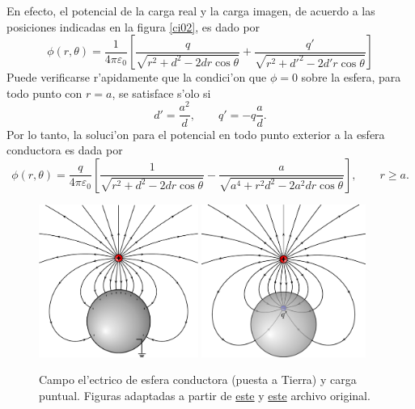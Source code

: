 En efecto, el potencial de la carga real y la carga imagen, de acuerdo a las posiciones indicadas en la figura \ref{ci02}, es dado por
\begin{equation}
 \phi(r,\theta)=\frac{1}{4\pi\varepsilon_0}\left[\frac{q}{\sqrt{
r^2+d^2-2dr\cos\theta } } +\frac{q'}{\sqrt{r^2+d'^2-2d'r\cos\theta}}\right]
\end{equation}
Puede verificarse r'apidamente que la condici'on que $\phi=0$ sobre la esfera, para todo punto con $r=a$, se satisface s'olo si
\begin{equation}
 d'=\frac{a^2}{d}, \qquad q'=-q\frac{a}{d}.
\end{equation}
Por lo tanto, la soluci'on para el potencial en todo punto exterior a la
esfera conductora es dada por
\begin{equation}\label{phice}
 \phi(r,\theta)=\frac{q}{4\pi\varepsilon_0}\left[\frac{1}{\sqrt{
r^2+d^2-2dr\cos\theta}}
-\frac{a}{\sqrt{a^4+r^2d^2-2a^2dr\cos\theta}}\right], \qquad r\ge a .
\end{equation}
\begin{center}
\begin{figure}[H]
\centerline{\includegraphics[height=5cm]{fig/fig-metodo-imagen-esfera-01.pdf}
\hspace{2cm}\includegraphics[height=5cm]{fig/fig-metodo-imagen-esfera-02.pdf}}
\caption{Campo el'ectrico de esfera conductora (puesta a Tierra) y carga puntual. 
Figuras adaptadas a partir de  \href{http://commons.wikimedia.org/wiki/File:VFPt_metal_ball_grounded.svg}{este} y \href{http://commons.wikimedia.org/wiki/File:VFPt_metal_ball_grounded_transparent.svg}{este} archivo original.}
\label{fig:eyc}
\end{figure}
\end{center}
